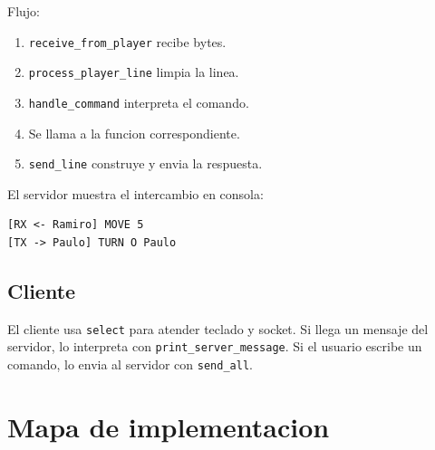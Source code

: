 \documentclass[12pt,a4paper]{article}
\begin{document}
Flujo:

\begin{enumerate}
    \item \texttt{receive\_from\_player} recibe bytes.
    \item \texttt{process\_player\_line} limpia la linea.
    \item \texttt{handle\_command} interpreta el comando.
    \item Se llama a la funcion correspondiente.
    \item \texttt{send\_line} construye y envia la respuesta.
\end{enumerate}

El servidor muestra el intercambio en consola:

\begin{lstlisting}[style=code]
[RX <- Ramiro] MOVE 5
[TX -> Paulo] TURN O Paulo
\end{lstlisting}

\subsection{Cliente}

El cliente usa \texttt{select} para atender teclado y socket. Si llega un
mensaje del servidor, lo interpreta con \texttt{print\_server\_message}. Si el
usuario escribe un comando, lo envia al servidor con \texttt{send\_all}.

\section{Mapa de implementacion}
\end{document}
